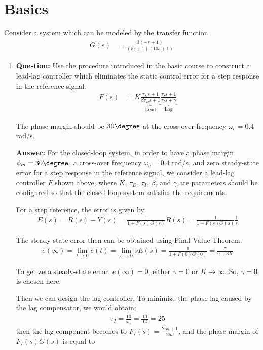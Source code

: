\section{Basics}

\par Consider a system which can be modeled by the transfer function
\begin{align*}
	G(s) &= \frac{3(-s+1)}{(5s+1)(10s+1)}
\end{align*}
\begin{enumerate}
	\item \textbf{Question:} Use the procedure introduced in the basic course to construct a lead-lag controller which eliminates the static control error for a step response in the reference signal.
	\begin{align*}
		F(s) &= K\underbrace{\frac{\tau_{D}s+1}{\beta\tau_{D}s+1}}_{\mathrm{Lead}}\underbrace{\frac{\tau_{I}s+1}{\tau_{I}s+\gamma}}_{\mathrm{Lag}}
	\end{align*}
	\par The phase margin should be $30\degree$ at the cross-over frequency $\omega_{c}=0.4$ rad/s.
	\par \textbf{Answer:} For the closed-loop system, in order to have a phase margin $\phi_{m}=30\degree$, a cross-over frequency $\omega_{c}=0.4$ rad/s, and zero steady-state error for a step response in the reference signal, we consider a lead-lag controller $F$ shown above, where $K$, $\tau_{D}$, $\tau_{I}$, $\beta$, and $\gamma$ are parameters should be configured so that the closed-loop system satisfies the requirements.
	\par For a step reference, the error is given by
	\begin{align*}
		E(s) = R(s) - Y(s) = \frac{1}{1+F(s)G(s)}R(s) = \frac{1}{1+F(s)G(s)}\frac{1}{s}
	\end{align*}
	\par The steady-state error then can be obtained using Final Value Theorem:
	\begin{align*}
		e(\infty) = \lim_{t\rightarrow 0}e(t) = \lim_{s\rightarrow 0} sE(s) = \frac{1}{1+F(0)G(0)} = \frac{\gamma}{\gamma + 3K}
	\end{align*}
	\par To get zero steady-state error, $e(\infty) = 0$, either $\gamma = 0$ or $K \rightarrow \infty$. So, $\gamma = 0$ is chosen here.
	\par Then we can design the lag controller. To minimize the phase lag caused by the lag compensator, we would obtain:
	\begin{align*}
		\tau_{I} = \frac{10}{\omega_{c}} = \frac{10}{0.4} = 25
	\end{align*}
	then the lag component becomes to $F_{I}(s) = \frac{25s+1}{25s}$, and the phase margin of $F_{I}(s)G(s)$ is equal to 
	

\end{enumerate}
